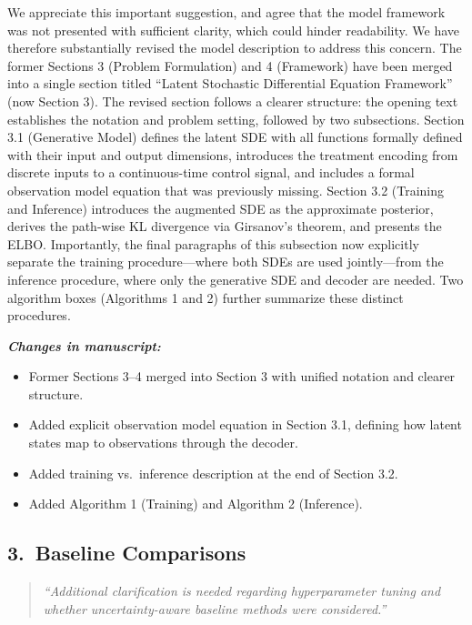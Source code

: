 \documentclass[12pt]{article}
\newcommand{\reviewercomment}[1]{%
  \begin{quote}
  \textcolor{reviewergray}{\textit{``#1''}}
  \end{quote}
}
\newcommand{\changes}{\vspace{0.3em}\noindent\textbf{\textit{Changes in manuscript:}}\vspace{0.2em}}
\begin{document}
We appreciate this important suggestion, and agree that the model framework was not presented with sufficient clarity, which could hinder readability. We have therefore substantially revised the model description to address this concern. The former Sections 3 (Problem Formulation) and 4 (Framework) have been merged into a single section titled ``Latent Stochastic Differential Equation Framework'' (now Section 3). The revised section follows a clearer structure: the opening text establishes the notation and problem setting, followed by two subsections. Section 3.1 (Generative Model) defines the latent SDE with all functions formally defined with their input and output dimensions, introduces the treatment encoding from discrete inputs to a continuous-time control signal, and includes a formal observation model equation that was previously missing. Section 3.2 (Training and Inference) introduces the augmented SDE as the approximate posterior, derives the path-wise KL divergence via Girsanov's theorem, and presents the ELBO. Importantly, the final paragraphs of this subsection now explicitly separate the training procedure---where both SDEs are used jointly---from the inference procedure, where only the generative SDE and decoder are needed. Two algorithm boxes (Algorithms 1 and 2) further summarize these distinct procedures.

\changes
\begin{itemize}[leftmargin=2em]
\item Former Sections 3--4 merged into Section 3 with unified notation and clearer structure.
\item Added explicit observation model equation in Section 3.1, defining how latent states map to observations through the decoder.
\item Added training vs.\ inference description at the end of Section 3.2.
\item Added Algorithm 1 (Training) and Algorithm 2 (Inference).
\end{itemize}

\subsection*{3.\ Baseline Comparisons}

\reviewercomment{Additional clarification is needed regarding hyperparameter tuning and whether uncertainty-aware baseline methods were considered.}
\end{document}
